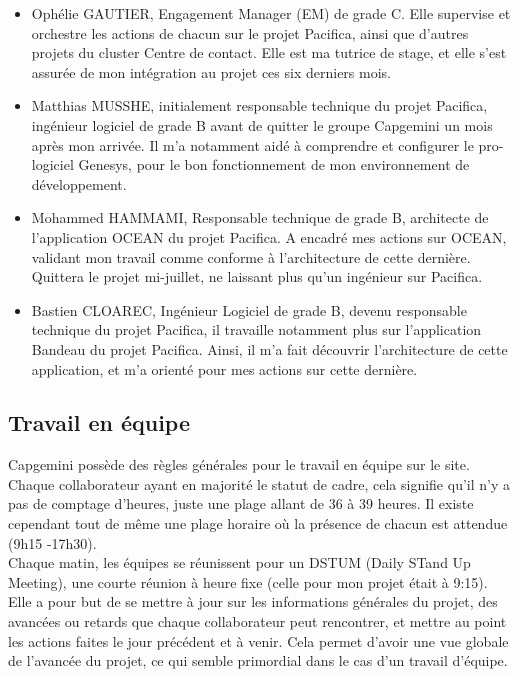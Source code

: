 \documentclass{rapport}
\begin{document}
\begin{itemize}
  \item Ophélie GAUTIER, Engagement Manager (EM) de grade C. Elle supervise et orchestre les actions de chacun sur le projet Pacifica, ainsi que d'autres projets du cluster Centre de contact. Elle est ma tutrice de stage, et elle s'est assurée de mon intégration au projet ces six derniers mois.\\
  
  \item Matthias MUSSHE, initialement responsable technique du projet Pacifica, ingénieur logiciel de grade B avant de quitter le groupe Capgemini un mois après mon arrivée. Il m'a notamment aidé à comprendre et configurer le pro-logiciel Genesys, pour le bon fonctionnement de mon environnement de développement.\\
  
  \item Mohammed HAMMAMI, Responsable technique de grade B, architecte de l'application OCEAN du projet Pacifica. A encadré mes actions sur OCEAN, validant mon travail comme conforme à l'architecture de cette dernière. Quittera le projet mi-juillet, ne laissant plus qu'un ingénieur sur Pacifica.\\
  
  \item Bastien CLOAREC, Ingénieur Logiciel de grade B, devenu responsable technique du projet Pacifica, il travaille notamment plus sur l'application Bandeau du projet Pacifica. Ainsi, il m'a fait découvrir l'architecture de cette application, et m'a orienté pour mes actions sur cette dernière.\\
  
\end{itemize}

\subsection{Travail en équipe}
Capgemini possède des règles générales pour le travail en équipe sur le site. Chaque collaborateur ayant en majorité le statut de cadre, cela signifie qu'il n'y a pas de comptage d'heures, juste une plage allant de 36 à 39 heures. Il existe cependant tout de même une plage horaire où la présence de chacun est attendue (9h15 -17h30).\\

Chaque matin, les équipes se réunissent pour un DSTUM (Daily STand Up Meeting), une courte réunion à heure fixe (celle pour mon projet était à 9:15). Elle a pour but de se mettre à jour sur les informations générales du projet, des avancées ou retards que chaque collaborateur peut rencontrer, et mettre au point les actions faites le jour précédent et à venir. Cela permet d'avoir une vue globale de l'avancée du projet, ce qui semble primordial dans le cas d'un travail d'équipe.\\
\end{document}
